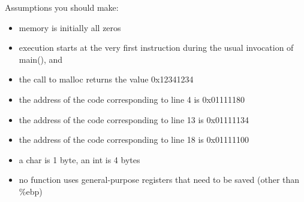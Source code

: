 \documentclass[11pt]{article}
\begin{document}
Assumptions you should make:
\begin{itemize}
\item memory is initially all zeros
\item execution starts at the very first instruction during the usual invocation of main(),
and %
\item the call to malloc returns the value 0x12341234
\item the address of the code corresponding to line 4 is 0x01111180
\item the address of the code corresponding to line 13 is 0x01111134
\item the address of the code corresponding to line 18 is 0x01111100
\item a char is 1 byte, an int is 4 bytes
\item no function uses general-purpose registers that need to be saved (other than \%ebp)
\end{itemize}
\newpage
\end{document}
